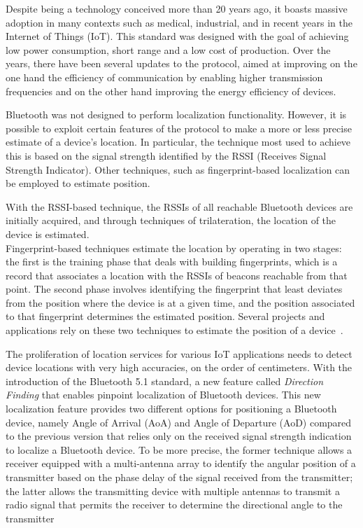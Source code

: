Despite being a technology conceived more than 20 years ago, it boasts massive adoption in many contexts such as medical, industrial, and in
recent years in the Internet of Things (IoT). This standard was designed with the goal of achieving low power consumption, short range
and a low cost of production. Over the years, there have been several updates to the protocol, aimed at improving on the one hand the efficiency of
communication by enabling higher transmission frequencies and on the other hand improving the energy efficiency of devices.

Bluetooth was not designed to perform localization functionality. However, it is possible to exploit certain
features of the protocol to make a more or less precise estimate of a device's location. In particular, the technique most
used to achieve this is based on the signal strength identified by the RSSI (Receives Signal Strength Indicator).
Other techniques, such as fingerprint-based localization can be employed to estimate position.

With the RSSI-based technique, the RSSIs of all reachable Bluetooth devices are initially acquired, and through techniques of trilateration, the
location of the device is estimated.\\
Fingerprint-based techniques estimate the location by operating in two stages: the first is the training phase that deals with building fingerprints,
which is a record that associates a location with the RSSIs of beacons reachable from that
point. The second phase involves identifying the fingerprint that least deviates from the position where the device is at a given time, and the
position associated to that fingerprint determines the estimated position. Several projects and applications rely on these two techniques to estimate
the position of a device~\cite{mcconville2021vesta, samuel2021smart}.

The proliferation of location services for various IoT applications needs to detect device locations with very high accuracies, on the order of
centimeters. With the introduction of the Bluetooth 5.1 standard, a new feature called \textit{Direction Finding} that enables pinpoint localization
of Bluetooth devices.
This new localization feature provides two different options for positioning a Bluetooth device, namely Angle of Arrival (AoA) and Angle of Departure
(AoD) compared to the previous version that relies only on the received signal strength indication to localize a Bluetooth device.
To be more precise, the former technique allows a receiver equipped with a multi-antenna array to identify the angular position of a transmitter
based on the phase delay of the signal received from the transmitter; the latter allows the transmitting device with multiple antennas to transmit a
radio signal that permits the receiver to determine the directional angle to the transmitter

